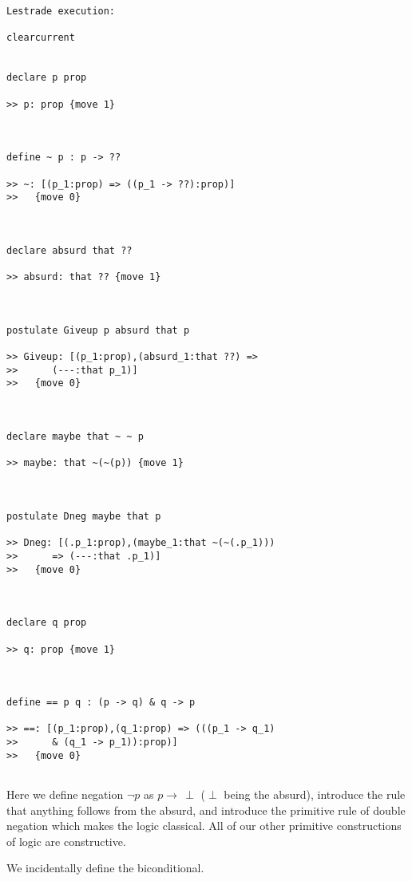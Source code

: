 \documentclass[12pt]{article}
\begin{document}
\begin{verbatim}Lestrade execution:

clearcurrent


declare p prop

>> p: prop {move 1}



define ~ p : p -> ??

>> ~: [(p_1:prop) => ((p_1 -> ??):prop)]
>>   {move 0}



declare absurd that ??

>> absurd: that ?? {move 1}



postulate Giveup p absurd that p

>> Giveup: [(p_1:prop),(absurd_1:that ??) =>
>>      (---:that p_1)]
>>   {move 0}



declare maybe that ~ ~ p

>> maybe: that ~(~(p)) {move 1}



postulate Dneg maybe that p

>> Dneg: [(.p_1:prop),(maybe_1:that ~(~(.p_1)))
>>      => (---:that .p_1)]
>>   {move 0}



declare q prop

>> q: prop {move 1}



define == p q : (p -> q) & q -> p

>> ==: [(p_1:prop),(q_1:prop) => (((p_1 -> q_1)
>>      & (q_1 -> p_1)):prop)]
>>   {move 0}


\end{verbatim}

Here we define negation $\neg p$ as $p \rightarrow \, \perp$ ($\perp$ being the absurd), introduce the rule that anything follows from the absurd, and introduce the primitive rule of  double negation which makes the logic classical.
All of our other primitive constructions of logic are constructive.

We incidentally define the biconditional.
\end{document}
